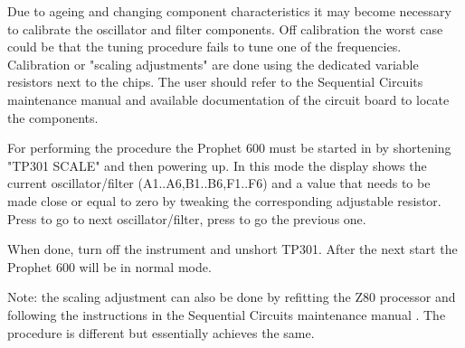 Due to ageing and changing component characteristics it may become necessary to calibrate the oscillator and filter components. Off calibration the worst case could be that the tuning procedure fails to tune one of the frequencies. Calibration or "scaling adjustments" are done using the dedicated variable resistors next to the chips. The user should refer to the Sequential Circuits maintenance manual \cite{p600siservicemanual} and available documentation of the circuit board to locate the components. 

For performing the procedure the Prophet 600 must be started in \maintenance by shortening "TP301 SCALE" and then powering up. In this mode the display shows the current oscillator/filter (A1..A6,B1..B6,F1..F6) and a value that needs to be made close or equal to zero by tweaking the corresponding adjustable resistor. Press  to go to next oscillator/filter, press  to go the previous one.

When done, turn off the instrument and unshort TP301. After the next start the Prophet 600 will be in normal mode.

Note: the scaling adjustment can also be done by refitting the Z80 processor and following the instructions in the Sequential Circuits maintenance manual \cite{p600siservicemanual}. The procedure is different but essentially achieves the same.
